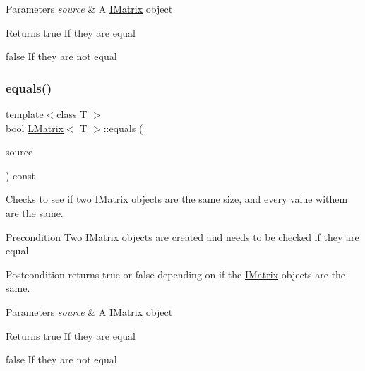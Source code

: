 \begin{DoxyParams}{Parameters}
{\em source} & A \mbox{\hyperlink{class_i_matrix}{I\+Matrix}} object \\
\hline
\end{DoxyParams}
\begin{DoxyReturn}{Returns}
true If they are equal 

false If they are not equal 
\end{DoxyReturn}
\mbox{\label{class_l_matrix_a11fde8a497e4c0c733f6602230ec7ccb}} 
\subsubsection{\texorpdfstring{equals()}{equals()}\hspace{0.1cm}{\footnotesize\ttfamily [6/6]}}
{\footnotesize\ttfamily template$<$class T $>$ \\
bool \mbox{\hyperlink{class_l_matrix}{L\+Matrix}}$<$ T $>$\+::equals (\begin{DoxyParamCaption}\item[{const \mbox{\hyperlink{class_i_matrix}{I\+Matrix}}$<$ \mbox{\hyperlink{class_d_matrix}{D\+Matrix}}$<$ T $>$, T $>$ \&}]{source }\end{DoxyParamCaption}) const}



Checks to see if two \mbox{\hyperlink{class_i_matrix}{I\+Matrix}} objects are the same size, and every value withem are the same. 

\begin{DoxyPrecond}{Precondition}
Two \mbox{\hyperlink{class_i_matrix}{I\+Matrix}} objects are created and needs to be checked if they are equal 
\end{DoxyPrecond}
\begin{DoxyPostcond}{Postcondition}
returns true or false depending on if the \mbox{\hyperlink{class_i_matrix}{I\+Matrix}} objects are the same.
\end{DoxyPostcond}

\begin{DoxyParams}{Parameters}
{\em source} & A \mbox{\hyperlink{class_i_matrix}{I\+Matrix}} object \\
\hline
\end{DoxyParams}
\begin{DoxyReturn}{Returns}
true If they are equal 

false If they are not equal 
\end{DoxyReturn}
\mbox{\label{class_l_matrix_ae7adc0f92e3648751fe49852ad158ea2}} 
